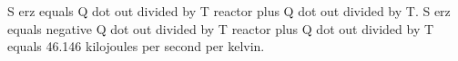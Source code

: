 S erz equals Q dot out divided by T reactor plus Q dot out divided by T.  
S erz equals negative Q dot out divided by T reactor plus Q dot out divided by T equals 46.146 kilojoules per second per kelvin.